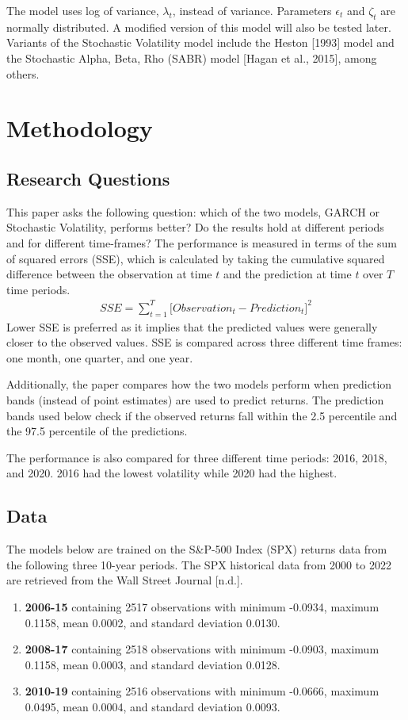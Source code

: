 \documentclass[12pt,letterpaper,reqno,fleqn]{article}
\begin{document}
The model uses log of variance, $\lambda_t$, instead of variance. Parameters $\epsilon_t$ and $\zeta_t$ are normally distributed. A modified version of this model will also be tested later. Variants of the Stochastic Volatility model include the Heston [1993] model and the Stochastic Alpha, Beta, Rho (SABR) model [Hagan et al., 2015], among others.

\newpage
\section{Methodology}

\subsection{Research Questions}
This paper asks the following question: which of the two models, GARCH or Stochastic Volatility, performs better? Do the results hold at different periods and for different time-frames? The performance is measured in terms of the sum of squared errors (SSE), which is calculated by taking the cumulative squared difference between the observation at time $t$ and the prediction at time $t$ over $T$ time periods.
\begin{align}
SSE = \sum_{t=1}^T \big[ Observation_t - Prediction_t \big] ^2 \nonumber
\end{align}
Lower SSE is preferred as it implies that the predicted values were generally closer to the observed values. SSE is compared across three different time frames: one month, one quarter, and one year. 

Additionally, the paper compares how the two models perform when prediction bands (instead of point estimates) are used to predict returns. The prediction bands used below check if the observed returns fall within the 2.5 percentile and the 97.5 percentile of the predictions. 

The performance is also compared for three different time periods: 2016, 2018, and 2020. 2016 had the lowest volatility while 2020 had the highest.

\subsection{Data}
The models below are trained on the S\&P-500 Index (SPX) returns data from the following three 10-year periods. The SPX historical data from 2000 to 2022 are retrieved from the Wall Street Journal [n.d.].

\begin{enumerate}
\item \textbf{2006-15} containing 2517 observations with minimum -0.0934, maximum 0.1158, mean 0.0002, and standard deviation 0.0130.

\item \textbf{2008-17} containing 2518 observations with minimum -0.0903, maximum 0.1158, mean 0.0003, and standard deviation 0.0128.

\item \textbf{2010-19} containing 2516 observations with minimum -0.0666, maximum 0.0495, mean 0.0004, and standard deviation 0.0093.
\end{enumerate}
\end{document}
